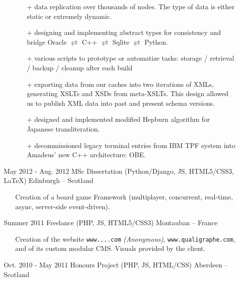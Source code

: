 \documentclass{res}
\begin{document}
\begin{resume}
\begin{itemize}
\begin{itemize}
\begin{itemize}
                                \item[+] data replication over thousands of nodes. The type of data is either static or extremely dynamic.
                                \item[+] designing and implementing abstract types for consistency and bridge Oracle $\rightleftarrows$ C++ $\rightleftarrows$ Sqlite $\rightleftarrows$ Python.
                                \item[+] various scripts to prototype or automatize tasks: storage / retrieval / backup / cleanup after each build\textellipsis
                                \item[+] exporting data from our caches into two iterations of XMLs, generating XSLTs and XSDs from meta-XSLTs. This design allowed us to publish XML data into past and present schema versions.
																\item[+] designed and implemented modified Hepburn algorithm for Japanese transliteration.
																\item[+] decommissioned legacy terminal entries from IBM TPF system into Amadeus' new C++ architecture: OBE.
                        \end{itemize}
                \end{itemize}
                \item[] May 2012 - Aug. 2012 \tabto{5cm} MSc Dissertation (Python/Django, JS, HTML5/CSS3, \LaTeX{}) \hfill Edinburgh -- Scotland
                \begin{itemize}
                        \item[] Creation of a board game Framework (multiplayer, concurrent, real-time, async, server-side event-driven).
                \end{itemize}
                \item[] Summer 2011 \tabto{5cm} Freelance (PHP, JS, HTML5/CSS3) \hfill Montauban -- France
                \begin{itemize}
                        \item[] Creation of the website \ifisanon \texttt{www....com} \textit{(Anonymous)}, \else \texttt{www.qualigraphe.com}, \fi and of its custom modular CMS. Visuals provided by the client.
                \end{itemize}
                \item[] Oct. 2010 - May 2011 \tabto{5cm} Honours Project (PHP, JS, HTML/CSS) \hfill Aberdeen -- Scotland
                \begin{itemize}

\end{itemize}
\end{itemize}
\end{resume}
\end{document}
